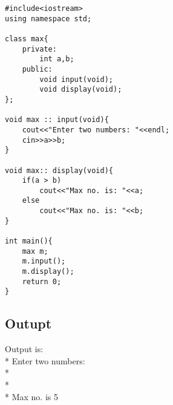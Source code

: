 \begin{lstlisting}
#include<iostream>
using namespace std;

class max{
	private:
		int a,b;
	public:
		void input(void);
		void display(void);
};

void max :: input(void){
	cout<<"Enter two numbers: "<<endl;
	cin>>a>>b;
}

void max:: display(void){
	if(a > b)
		cout<<"Max no. is: "<<a;
	else
		cout<<"Max no. is: "<<b;
}

int main(){
	max m;
	m.input();
	m.display();
	return 0;
}
\end{lstlisting}

\subsection{Outupt}
Output is: 
\\* \tab Enter two numbers: 
\\* 
\\* 
\\* \tab Max no. is 5
